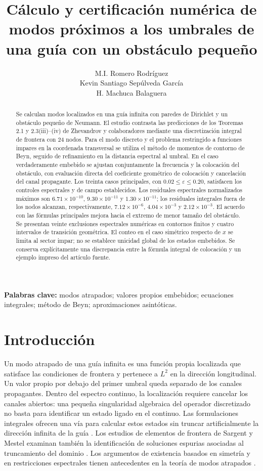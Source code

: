 \documentclass[11pt]{article}
\title{Cálculo y certificación numérica de modos próximos a los umbrales de una guía con un obstáculo pequeño}
\author{M.I. Romero Rodr\'iguez\\Kevin Santiago Sepúlveda García\\H. Machuca Balaguera}
\date{}
\newcommand{\eps}{\varepsilon}
\begin{document}
\maketitle

\begin{abstract}
Se calculan modos localizados en una guía infinita con paredes de Dirichlet y un obstáculo pequeño de Neumann. El estudio contrasta las predicciones de los Teoremas 2.1 y 2.3(iii)--(iv) de Zhevandrov y colaboradores mediante una discretización integral de frontera con 24 nodos. Para el modo discreto y el problema restringido a funciones impares en la coordenada transversal se utiliza el método de momentos de contorno de Beyn, seguido de refinamiento en la distancia espectral al umbral. En el caso verdaderamente embebido se ajustan conjuntamente la frecuencia y la colocación del obstáculo, con evaluación directa del coeficiente geométrico de colocación y cancelación del canal propagante. Los treinta casos principales, con $0.02\leq\eps\leq0.20$, satisfacen los controles espectrales y de campo establecidos. Los residuales espectrales normalizados máximos son $6.71\times10^{-10}$, $9.30\times10^{-11}$ y $1.30\times10^{-11}$; los residuales integrales fuera de los nodos alcanzan, respectivamente, $7.12\times10^{-6}$, $4.04\times10^{-3}$ y $2.12\times10^{-3}$. El acuerdo con las fórmulas principales mejora hacia el extremo de menor tamaño del obstáculo. Se presentan veinte exclusiones espectrales numéricas en contornos finitos y cuatro intervalos de transición geométrica. El conteo en el caso simétrico respecto de $x$ se limita al sector impar; no se establece unicidad global de los estados embebidos. Se conserva explícitamente una discrepancia entre la fórmula integral de colocación y un ejemplo impreso del artículo fuente.
\end{abstract}
\noindent\textbf{Palabras clave:} modos atrapados; valores propios embebidos; ecuaciones integrales; método de Beyn; aproximaciones asintóticas.

\section{Introducción}
Un modo atrapado de una guía infinita es una función propia localizada que satisface las condiciones de frontera y pertenece a $L^2$ en la dirección longitudinal. Un valor propio por debajo del primer umbral queda separado de los canales propagantes. Dentro del espectro continuo, la localización requiere cancelar los canales abiertos: una pequeña singularidad algebraica del operador discretizado no basta para identificar un estado ligado en el continuo. Las formulaciones integrales ofrecen una vía para calcular estos estados sin truncar artificialmente la dirección infinita de la guía \cite{Linton1992}. Los estudios de elementos de frontera de Sargent y Mestel examinan también la identificación de soluciones espurias asociadas al truncamiento del dominio \cite{SargentMestel2019}. Los argumentos de existencia basados en simetría y en restricciones espectrales tienen antecedentes en la teoría de modos atrapados \cite{Evans1994}.
\end{document}
